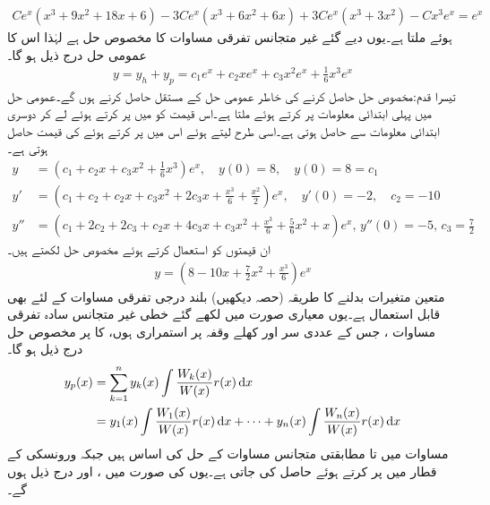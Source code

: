 \begin{align*}
Ce^x(x^3+9x^2+18x+6)-3Ce^x(x^3+6x^2+6x)+3Ce^x(x^3+3x^2)-Cx^3e^x=e^{x}
\end{align*}
ہوئے  ملتا ہے۔یوں دیے گئے غیر متجانس تفرقی مساوات کا مخصوص حل  ہے لہٰذا اس کا عمومی حل درج ذیل ہو گا۔
\begin{align*}
y=y_h+y_p=c_1e^x+c_2xe^x+c_3x^2e^x+\frac{1}{6}x^3e^x
\end{align*}
تیسرا قدم:\quad مخصوص حل حاصل کرنے کی خاطر عمومی حل کے مستقل حاصل کرنے ہوں گے۔عمومی حل میں پہلی ابتدائی معلومات  پر کرتے ہوئے  ملتا ہے۔اس قیمت کو  میں پر کرتے ہوئے  لے کر دوسری ابتدائی معلومات  سے  حاصل ہوتی ہے۔اسی طرح  لیتے ہوئے اس میں  پر کرتے ہوئے  کی قیمت حاصل ہوتی ہے۔
\begin{align*}
y&=(c_1+c_2x+c_3x^2+\frac{1}{6}x^3)e^x, \quad y(0)=8, \quad y(0)=8=c_1\\
y'&=(c_1+c_2+c_2x+c_3x^2+2c_3x+\frac{x^3}{6}+\frac{x^2}{2})e^x, \quad y'(0)=-2, \quad c_2=-10\\
y''&=(c_1+2c_2+2c_3+c_2x+4c_3x+c_3x^2+\frac{x^3}{6}+\frac{5}{6}x^2+x)e^x,\,y''(0)=-5, \, c_3=\frac{7}{2}
\end{align*} 
ان قیمتوں کو استعمال کرتے ہوئے مخصوص حل لکھتے ہیں۔
\begin{align*}
y=\left(8-10x+\frac{7}{2}x^2+\frac{x^3}{6}\right)e^x
\end{align*}
متعین متغیرات بدلنے کا طریقہ (حصہ  دیکھیں) بلند درجی تفرقی مساوات  کے لئے بھی قابل استعمال ہے۔یوں معیاری صورت میں لکھے گئے خطی غیر متجانس سادہ تفرقی مساوات  ، جس کے عددی سر اور  کھلے وقفہ  پر استمراری ہوں، کا   پر مخصوص حل  درج ذیل ہو گا۔
\begin{gather}
\begin{aligned}\label{مساوات_سادہ_بلند_متعین_متغیرات_بدلنے_الف}
y_p(x)&=\sum_{k=1}^{n} y_k(x)\int \frac{W_k(x)}{W(x)} r(x)\dif x\\
&=y_1(x)\int \frac{W_1(x)}{W(x)}r(x)\dif x+\cdots+y_n(x)\int \frac{W_n(x)}{W(x)}r(x)\dif x
\end{aligned}
\end{gather}
مساوات  میں  تا  مطابقتی متجانس مساوات  کے حل کی اساس ہیں جبکہ ورونسکی  کے  قطار میں  پر کرتے ہوئے  حاصل کی جاتی ہے۔یوں  کی صورت میں ،  اور  درج ذیل ہوں گے۔
